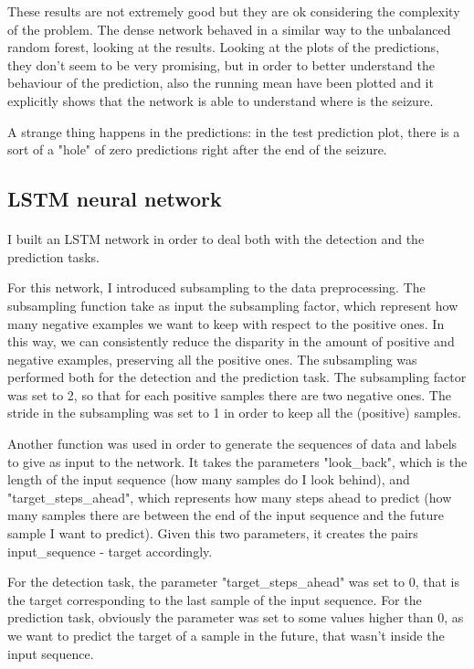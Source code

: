 These results are not extremely good but they are ok considering the complexity of the problem. The dense network behaved in a similar way to the unbalanced random forest, looking at the results. Looking at the plots of the predictions, they don't seem to be very promising, but in order to better understand the behaviour of the prediction, also the running mean have been plotted and it explicitly shows that the network is able to understand where is the seizure.

A strange thing happens in the predictions: in the test prediction plot, there is a sort of a "hole" of zero predictions right after the end of the seizure.

\subsection{LSTM neural network}

\paragraph{} I built an LSTM network in order to deal both with the detection and the prediction tasks.

For this network, I introduced subsampling to the data preprocessing. The subsampling function take as input the subsampling factor, which represent how many negative examples we want to keep with respect to the positive ones. In this way, we can consistently reduce the disparity in the amount of positive and negative examples, preserving all the positive ones. The subsampling was performed both for the detection and the prediction task. The subsampling factor was set to 2, so that for each positive samples there are two negative ones. The stride in the subsampling was set to 1 in order to keep all the (positive) samples.

Another function was used in order to generate the sequences of data and labels to give as input to the network. It takes the parameters "look\_back", which is the length of the input sequence (how many samples do I look behind), and "target\_steps\_ahead", which represents how many steps ahead to predict (how many samples there are between the end of the input sequence and the future sample I want to predict). Given this two parameters, it creates the pairs input\_sequence - target accordingly.

For the detection task, the parameter "target\_steps\_ahead" was set to 0, that is the target corresponding to the last sample of the input sequence. For the prediction task, obviously the parameter was set to some values higher than 0, as we want to predict the target of a sample in the future, that wasn't inside the input sequence.

